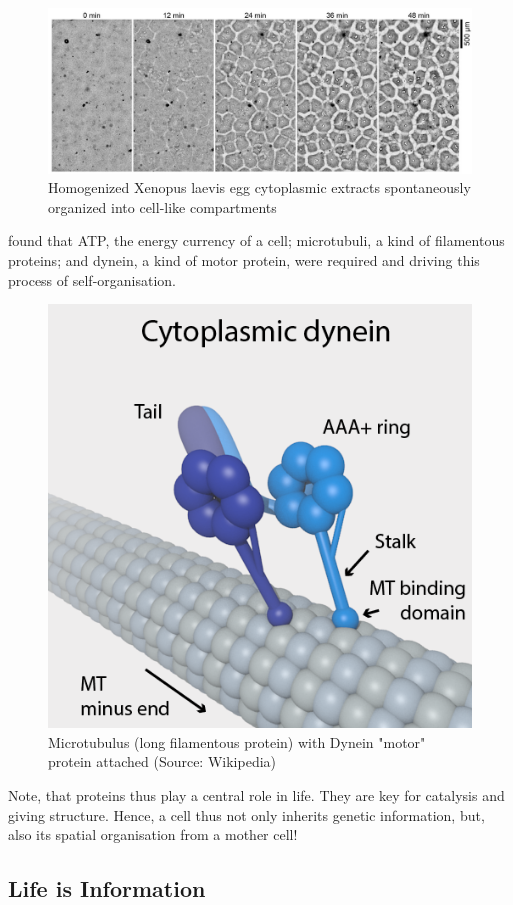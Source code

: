 \documentclass[
  11pt,
]{book}
\begin{document}
\begin{figure}

{\centering \includegraphics[width=1\linewidth]{./figs/selforganisation} 

}

\caption{Homogenized Xenopus laevis egg cytoplasmic extracts spontaneously organized into cell-like compartments \citep{Cheng2019}}\label{fig:selforganisation}
\end{figure}

\citet{Cheng2019} found that ATP, the energy currency of a cell; microtubuli, a kind of filamentous proteins; and dynein, a kind of motor protein, were required and driving this process of self-organisation.

\begin{figure}

{\centering \includegraphics[width=0.3\linewidth]{./figs/DyneinHeavyChainOnMT} 

}

\caption{Microtubulus (long filamentous protein) with Dynein "motor" protein attached (Source:  Wikipedia)}\label{fig:dynein}
\end{figure}

Note, that proteins thus play a central role in life. They are key for catalysis and giving structure. Hence, a cell thus not only inherits genetic information, but, also its spatial organisation from a mother cell!

\newpage

\hypertarget{lifeInformation}{%
\subsection{Life is Information}\label{lifeInformation}}
\end{document}
